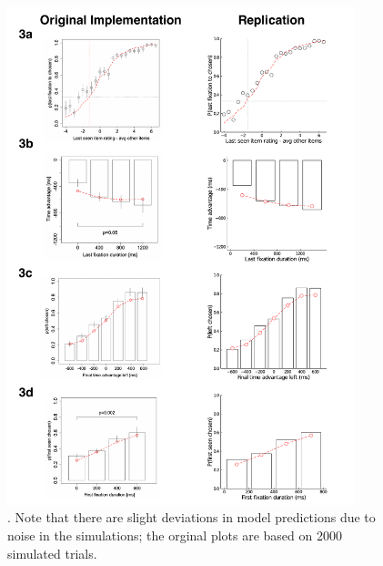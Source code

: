 \begin{figure}[tb!]
  \centering
  \includegraphics[width=0.9\textwidth]{figs/attention/supp-addm-replication-trinary.pdf}
  \caption{.
    Note that there are slight deviations in model predictions due to noise in the simulations; the orginal plots are based on 2000 simulated trials.
  }
  \label{fig:attention-addm3}
\end{figure}

\clearpage


